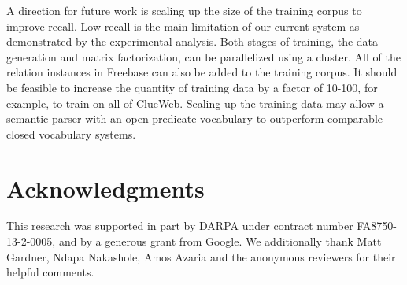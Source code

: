 \documentclass[11pt]{article}
\begin{document}

A direction for future work is scaling up the size of the training
corpus to improve recall. Low recall is the main limitation of our
current system as demonstrated by the experimental analysis. Both
stages of training, the data generation and matrix factorization, can
be parallelized using a cluster. All of the relation instances in
Freebase can also be added to the training corpus. It should be
feasible to increase the quantity of training data by a factor of
10-100, for example, to train on all of ClueWeb. Scaling up the
training data may allow a semantic parser with an open predicate
vocabulary to outperform comparable closed vocabulary systems.



\section*{Acknowledgments}
This research was supported in part by DARPA under contract number
FA8750-13-2-0005, and by a generous grant from Google. We additionally
thank Matt Gardner, Ndapa Nakashole, Amos Azaria and the anonymous
reviewers for their helpful comments.

{}

\end{document}
